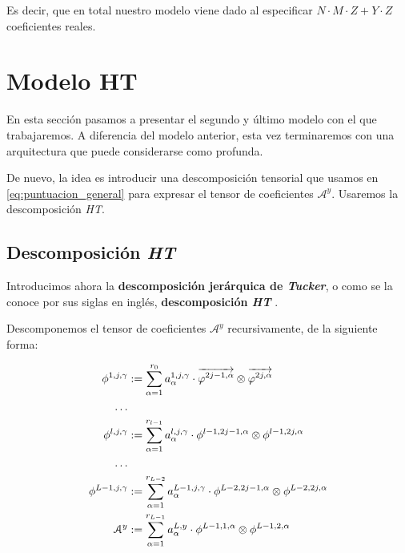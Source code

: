 Es decir, que en total nuestro modelo viene dado al especificar $N \cdot M \cdot Z + Y \cdot Z$ coeficientes reales.

\section{Modelo HT} \label{sec:modelo_ht}

En esta sección pasamos a presentar el segundo y último modelo con el que trabajaremos. A diferencia del modelo anterior, esta vez terminaremos con una arquitectura que puede considerarse como profunda.

De nuevo, la idea es introducir una descomposición tensorial que usamos en \eqref{eq:puntuacion_general} para expresar el tensor de coeficientes $\mathcal{A}^y$. Usaremos la descomposición \textit{HT}.

\subsection{Descomposición \textit{HT}} \label{subs:descomposicion_ht}

Introducimos ahora la \textbf{descomposición jerárquica de \textit{Tucker}}, o como se la conoce por sus siglas en inglés, \textbf{descomposición \textit{HT}} \cite{matematicas:descomposicion_ht} \cite{matematicas:principal}.

Descomponemos el tensor de coeficientes $\mathcal{A}^y$ recursivamente, de la siguiente forma:

\begin{equation} \label{eq:descomposicion_ht}
	\begin{split}
		\phi^{1, j, \gamma} &:= \sum_{\alpha = 1}^{r_0} a_{\alpha}^{1, j, \gamma} \cdot \overrightarrow{\varphi^{2j-1, \alpha}} \otimes \overrightarrow{\varphi^{2j, \alpha}} \\
		\ldots \\
		\phi^{l, j, \gamma} &:= \sum_{\alpha = 1}^{r_{l-1}} a_{\alpha}^{l, j, \gamma} \cdot \phi^{l-1, 2j-1, \alpha} \otimes \phi^{l-1, 2j, \alpha} \\
		\ldots \\
		\phi^{L - 1, j, \gamma} &:= \sum_{\alpha = 1}^{r_{L-2}} a_{\alpha}^{L - 1, j, \gamma} \cdot \phi^{L-2, 2j-1, \alpha} \otimes \phi^{L-2, 2j, \alpha} \\
		\mathcal{A}^y &:= \sum_{\alpha = 1}^{r_{L-1}} a_{\alpha}^{L, y} \cdot \phi^{L-1, 1, \alpha} \otimes \phi^{L-1, 2, \alpha}
	\end{split}
\end{equation}

